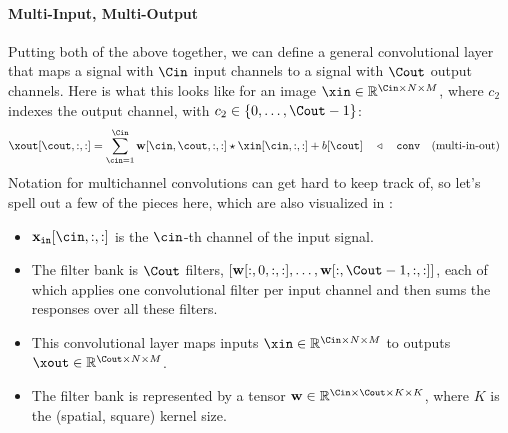 \paragraph*{Multi-Input, Multi-Output} Putting both of the above together, we can define a general convolutional layer that maps a signal with $\Cin$ input channels to a signal with $\Cout$ output channels. Here is what this looks like for an image $\xin \in \mathbb{R}^{\Cin \times N \times M}$, where $c_2$ indexes the output channel, with $c_2 \in \{0, \ldots, \Cout-1\}$:
\begin{align}
\xout[\cout,:,:] = \sum_{\cin=1}^{\Cin} \mathbf{w}[\cin,\cout,:,:] \star \xin[\cin,:,:] + b[\cout] & \quad \triangleleft \quad\texttt{conv}\quad \text{(multi-in-out)}
\label{eqn:convolutional_neural_nets:convolutional_layer_multichannel}
\end{align}
Notation for multichannel convolutions can get hard to keep track of, so let's spell out a few of the pieces here, which are also visualized in \fig{\ref{fig:convolutional_neural_networks:multichannel_conv}}:
\begin{itemize}
    \item $\mathbf{x}_{\texttt{in}}[\cin,:,:]$ is the $\cin$-th channel of the input signal.
    \item The filter bank is $\Cout$ filters, $[\mathbf{w}[:,0,:,:], \ldots, \mathbf{w}[:,\Cout-1,:,:]]$, each of which applies one convolutional filter per input channel and then sums the responses over all these filters.
    \item This convolutional layer maps inputs $\xin \in \mathbb{R}^{\Cin \times N \times M}$ to outputs $\xout \in \mathbb{R}^{\Cout \times N \times M}$.
    \item  The filter bank is represented by a tensor $\mathbf{w} \in \mathbb{R}^{\Cin \times \Cout \times K \times K}$, where $K$ is the (spatial, square) kernel size.
\end{itemize}


